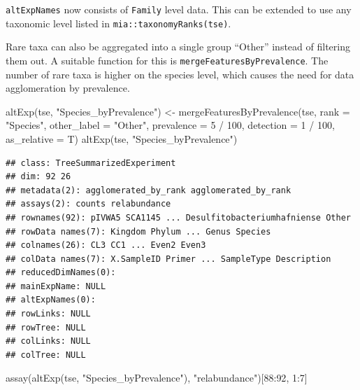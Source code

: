 \documentclass[
]{book}
\newenvironment{Shaded}{\begin{snugshade}}{\end{snugshade}}
\newcommand{\AttributeTok}[1]{\textcolor[rgb]{0.77,0.63,0.00}{#1}}
\newcommand{\DecValTok}[1]{\textcolor[rgb]{0.00,0.00,0.81}{#1}}
\newcommand{\FunctionTok}[1]{\textcolor[rgb]{0.00,0.00,0.00}{#1}}
\newcommand{\NormalTok}[1]{#1}
\newcommand{\OtherTok}[1]{\textcolor[rgb]{0.56,0.35,0.01}{#1}}
\newcommand{\SpecialCharTok}[1]{\textcolor[rgb]{0.00,0.00,0.00}{#1}}
\newcommand{\StringTok}[1]{\textcolor[rgb]{0.31,0.60,0.02}{#1}}
\begin{document}
\texttt{altExpNames} now consists of \texttt{Family} level data. This can be extended to use
any taxonomic level listed in \texttt{mia::taxonomyRanks(tse)}.

Rare taxa can also be aggregated into a single group ``Other'' instead of
filtering them out. A suitable function for this is \texttt{mergeFeaturesByPrevalence}.
The number of rare taxa is higher on the species level, which causes the need
for data agglomeration by prevalence.

\begin{Shaded}
\begin{Highlighting}[]
\FunctionTok{altExp}\NormalTok{(tse, }\StringTok{"Species\_byPrevalence"}\NormalTok{) }\OtherTok{\textless{}{-}} \FunctionTok{mergeFeaturesByPrevalence}\NormalTok{(tse, }
                                                               \AttributeTok{rank =} \StringTok{"Species"}\NormalTok{, }
                                                               \AttributeTok{other\_label =} \StringTok{"Other"}\NormalTok{, }
                                                               \AttributeTok{prevalence =} \DecValTok{5} \SpecialCharTok{/} \DecValTok{100}\NormalTok{, }
                                                               \AttributeTok{detection =} \DecValTok{1} \SpecialCharTok{/} \DecValTok{100}\NormalTok{, }
                                                               \AttributeTok{as\_relative =}\NormalTok{ T)}
\FunctionTok{altExp}\NormalTok{(tse, }\StringTok{"Species\_byPrevalence"}\NormalTok{)}
\end{Highlighting}
\end{Shaded}

\begin{verbatim}
## class: TreeSummarizedExperiment 
## dim: 92 26 
## metadata(2): agglomerated_by_rank agglomerated_by_rank
## assays(2): counts relabundance
## rownames(92): pIVWA5 SCA1145 ... Desulfitobacteriumhafniense Other
## rowData names(7): Kingdom Phylum ... Genus Species
## colnames(26): CL3 CC1 ... Even2 Even3
## colData names(7): X.SampleID Primer ... SampleType Description
## reducedDimNames(0):
## mainExpName: NULL
## altExpNames(0):
## rowLinks: NULL
## rowTree: NULL
## colLinks: NULL
## colTree: NULL
\end{verbatim}

\begin{Shaded}
\begin{Highlighting}[]
\FunctionTok{assay}\NormalTok{(}\FunctionTok{altExp}\NormalTok{(tse, }\StringTok{"Species\_byPrevalence"}\NormalTok{), }\StringTok{"relabundance"}\NormalTok{)[}\DecValTok{88}\SpecialCharTok{:}\DecValTok{92}\NormalTok{, }\DecValTok{1}\SpecialCharTok{:}\DecValTok{7}\NormalTok{]}
\end{Highlighting}
\end{Shaded}
\end{document}
